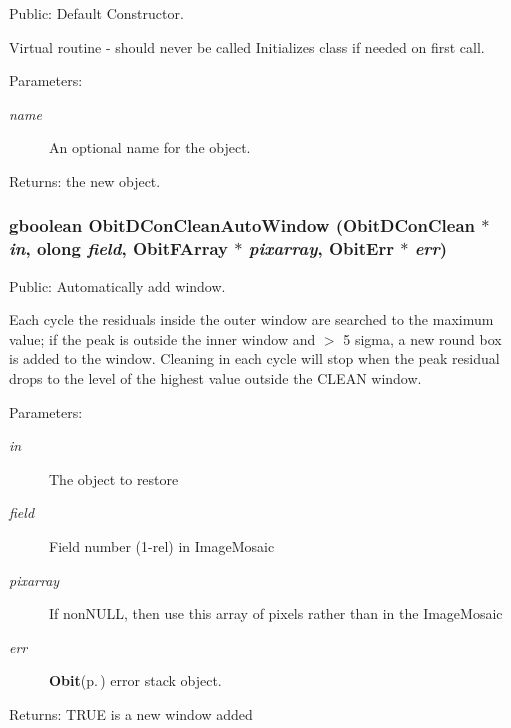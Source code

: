 Public: Default Constructor. 

Virtual routine - should never be called Initializes class if needed on first call. \begin{Desc}
\item[Parameters:]
\begin{description}
\item[{\em name}]An optional name for the object. \end{description}
\end{Desc}
\begin{Desc}
\item[Returns:]the new object. \end{Desc}
\subsubsection{\setlength{\rightskip}{0pt plus 5cm}gboolean Obit\-DCon\-Clean\-Auto\-Window ({\bf Obit\-DCon\-Clean} $\ast$ {\em in}, {\bf olong} {\em field}, {\bf Obit\-FArray} $\ast$ {\em pixarray}, {\bf Obit\-Err} $\ast$ {\em err})}\label{ObitDConClean_8h_a28}


Public: Automatically add window. 

Each cycle the residuals inside the outer window are searched to the maximum value; if the peak is outside the inner window and $>$ 5 sigma, a new round box is added to the window. Cleaning in each cycle will stop when the peak residual drops to the level of the highest value outside the CLEAN window. \begin{Desc}
\item[Parameters:]
\begin{description}
\item[{\em in}]The object to restore \item[{\em field}]Field number (1-rel) in Image\-Mosaic \item[{\em pixarray}]If non\-NULL, then use this array of pixels rather than in the Image\-Mosaic \item[{\em err}]{\bf Obit}{\rm (p.\,\pageref{structObit})} error stack object. \end{description}
\end{Desc}
\begin{Desc}
\item[Returns:]TRUE is a new window added \end{Desc}
